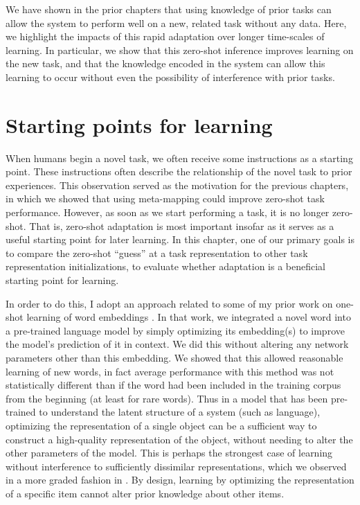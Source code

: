 We have shown in the prior chapters that using knowledge of prior tasks can allow the system to perform well on a new, related task without any data. Here, we highlight the impacts of this rapid adaptation over longer time-scales of learning. In particular, we show that this zero-shot inference improves learning on the new task, and that the knowledge encoded in the system can allow this learning to occur without even the possibility of interference with prior tasks. \par  

\section{Starting points for learning}

When humans begin a novel task, we often receive some instructions as a starting point. These instructions often describe the relationship of the novel task to prior experiences. This observation served as the motivation for the previous chapters, in which we showed that using meta-mapping could improve zero-shot task performance. However, as soon as we start performing a task, it is no longer zero-shot. That is, zero-shot adaptation is most important insofar as it serves as a useful starting point for later learning. In this chapter, one of our primary goals is to compare the zero-shot ``guess'' at a task representation to other task representation initializations, to evaluate whether adaptation is a beneficial starting point for learning. \par 
In order to do this, I adopt an approach related to some of my prior work on one-shot learning of word embeddings \citep{Lampinen2018a}. In that work, we integrated a novel word into a pre-trained language model by simply optimizing its embedding(s) to improve the model's prediction of it in context. We did this without altering any network parameters other than this embedding. We showed that this allowed reasonable learning of new words, in fact average performance with this method was not statistically different than if the word had been included in the training corpus from the beginning (at least for rare words). Thus in a model that has been pre-trained to understand the latent structure of a system (such as language), optimizing the representation of a single object can be a sufficient way to construct a high-quality representation of the object, without needing to alter the other parameters of the model. This is perhaps the strongest case of learning without interference to sufficiently dissimilar representations, which we observed in a more graded fashion in \citet{McClelland2020}. By design, learning by optimizing the representation of a specific item cannot alter prior knowledge about other items.\par
